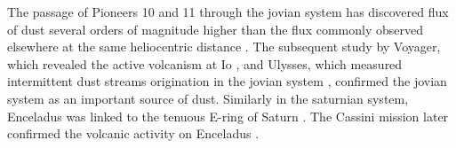 The passage of Pioneers 10 and 11 through the jovian system has discovered flux of dust several orders of magnitude higher than the flux commonly observed elsewhere at the same heliocentric distance \citep{humes1974interplanetary}. The subsequent study by Voyager, which revealed the active volcanism at Io \citep{kruger2004jovian}, and Ulysses, which measured intermittent dust streams origination in the jovian system \citep{grun1993discovery}, confirmed the jovian system as an important source of dust. Similarly in the saturnian system, Enceladus was linked to the tenuous E-ring of Saturn \citep{baum1981saturn}. The Cassini mission later confirmed the volcanic activity on Enceladus \citep{spahn2006cassini}. 

